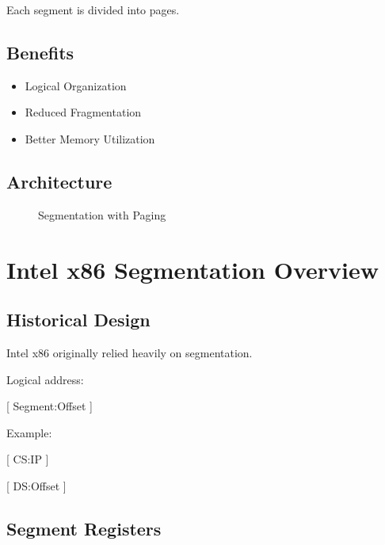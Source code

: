 Each segment is divided into pages.

\subsection{Benefits}

\begin{itemize}
\item Logical Organization
\item Reduced Fragmentation
\item Better Memory Utilization
\end{itemize}

\subsection{Architecture}

\begin{figure}[h]
\centering
{}
\caption{Segmentation with Paging}
\end{figure}

\section{Intel x86 Segmentation Overview}

\subsection{Historical Design}

Intel x86 originally relied heavily on segmentation.

Logical address:

[
Segment:Offset
]

Example:

[
CS:IP
]

[
DS:Offset
]

\subsection{Segment Registers}

